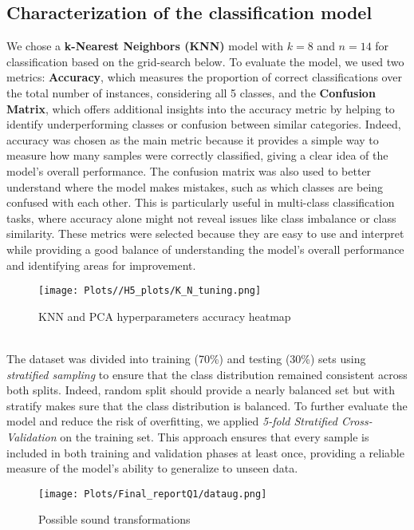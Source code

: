 \documentclass{article}
\begin{document}
\subsection{Characterization of the classification model}
We chose a \textbf{k-Nearest Neighbors (KNN)} model with $k=8$ and $n=14$ for classification based on the grid-search below. 
To evaluate the model, we used two metrics: \textbf{Accuracy}, which measures the proportion of correct classifications over the total number of instances, considering all 5 classes, and the \textbf{Confusion Matrix}, which offers additional insights into the accuracy metric by helping to identify underperforming classes or confusion between similar categories. Indeed, accuracy was chosen as the main metric because it provides a simple way to measure how many samples were correctly classified, giving a clear idea of the model's overall performance. The confusion matrix was also used to better understand where the model makes mistakes, such as which classes are being confused with each other. This is particularly useful in multi-class classification tasks, where accuracy alone might not reveal issues like class imbalance or class similarity. These metrics were selected because they are easy to use and interpret while providing a good balance of understanding the model's overall performance and identifying areas for improvement. 
\begin{figure}[h]
    \centering
    \texttt{[image: Plots//H5\_plots/K\_N\_tuning.png]}
    \caption{KNN and PCA hyperparameters accuracy heatmap}

\end{figure}
\\
The dataset was divided into training (70\%) and testing (30\%) sets using \textit{stratified sampling} to ensure that the class distribution remained consistent across both splits. Indeed, random split should provide a nearly balanced set but with stratify makes sure that the class distribution is balanced. To further evaluate the model and reduce the risk of overfitting, we applied \textit{5-fold Stratified Cross-Validation} on the training set. This approach ensures that every sample is included in both training and validation phases at least once, providing a reliable measure of the model's ability to generalize to unseen data. 
\begin{figure}[h]
    \centering
    \texttt{[image: Plots/Final\_reportQ1/dataug.png]}
    \caption{Possible sound transformations}
    \label{fig:enter-label}
\end{figure}
\end{document}
